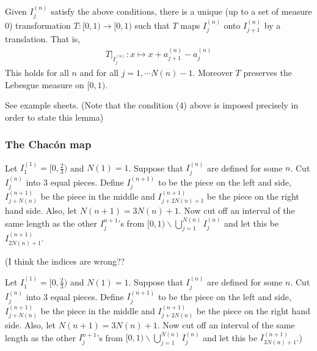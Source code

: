 \documentclass[10pt,a4paper]{report}
\newenvironment{proof}
{\begin{changemargin}{1cm}{0.5cm} 
	}%
	{\end{changemargin}
}
\begin{document}
\lem Given $I_j^{(n)}$ satisfy the above conditions, there is a unique (up to a set of measure 0) transformation $T: [0,1) \rightarrow [0,1)$ such that $T$ maps $I_j^{(n)}$ onto $I_{j+1}^{(n)}$ by a translation. That is, 
\begin{align*}
T \big|_{I_{j}^{(n)}} : x \mapsto x + a_{j+1}^{(n)} - a_j^{(n)}
\end{align*}
This holds for all $n$ and for all $j=1, \cdots N(n)-1$. Moreover $T$ preserves the Lebesgue measure on $[0,1)$.
\begin{proof}
\pf See example sheets. (Note that the condition (4) above is imposed precisely in order to state this lemma)
\end{proof}
\s

\subsubsection*{The Chac\'{o}n map}

Let $I_1^{(1)} = [0,\frac{2}{3})$ and $N(1) =1$. Suppose that $I_j^{(n)}$ are defined for some $n$. Cut $I_{j}^{(n)}$ into 3 equal pieces. Define $I_j^{(n+1)}$ to be the piece on the left and side, $I_{j+N(n)}^{(n+1)}$ be the piece in the middle and $I_{j+2N(n)+1}^{(n+1)}$ be the piece on the right hand side. Also, let $N(n+1) = 3N(n)+1$. Now cut off an interval of the same length as the other $I_j^{n+1}$'s from $[0,1) \backslash \bigcup_{j=1}^{N(n)} I_j^{(n)}$ and let this be $I_{2N(n)+1}^{(n+1)}$.

(I think the indices are wrong??
\s

Let $I_1^{(1)} = [0,\frac{2}{3})$ and $N(1) =1$. Suppose that $I_j^{(n)}$ are defined for some $n$. Cut $I_{j}^{(n)}$ into 3 equal pieces. Define $I_j^{(n+1)}$ to be the piece on the left and side, $I_{j+N(n)}^{(n+1)}$ be the piece in the middle and $I_{j+2N(n)}^{(n+1)}$ be the piece on the right hand side. Also, let $N(n+1) = 3N(n)+1$. Now cut off an interval of the same length as the other $I_j^{n+1}$'s from $[0,1) \backslash \bigcup_{j=1}^{N(n)} I_j^{(n)}$ and let this be $I_{3N(n)+1}^{(n+1)}$.)
\s
\end{document}

